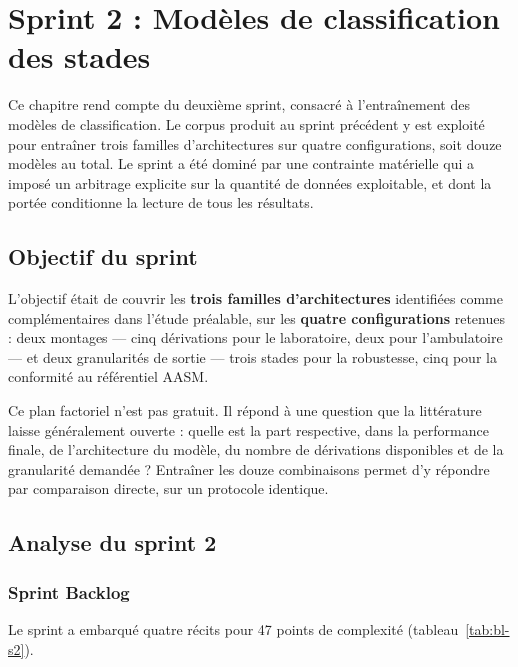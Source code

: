 \chapter{Sprint 2 : Modèles de classification des stades}
\label{chap:sprint2}


Ce chapitre rend compte du deuxième sprint, consacré à l'entraînement des modèles de
classification. Le corpus produit au sprint précédent y est exploité pour entraîner
trois familles d'architectures sur quatre configurations, soit douze modèles au total.
Le sprint a été dominé par une contrainte matérielle qui a imposé un arbitrage explicite
sur la quantité de données exploitable, et dont la portée conditionne la lecture de tous
les résultats.

\section{Objectif du sprint}

L'objectif était de couvrir les \textbf{trois familles d'architectures} identifiées
comme complémentaires dans l'étude préalable, sur les \textbf{quatre configurations}
retenues : deux montages --- cinq dérivations pour le laboratoire, deux pour
l'ambulatoire --- et deux granularités de sortie --- trois stades pour la robustesse,
cinq pour la conformité au référentiel AASM.

Ce plan factoriel n'est pas gratuit. Il répond à une question que la littérature laisse
généralement ouverte : quelle est la part respective, dans la performance finale, de
l'architecture du modèle, du nombre de dérivations disponibles et de la granularité
demandée ? Entraîner les douze combinaisons permet d'y répondre par comparaison directe,
sur un protocole identique.

\section{Analyse du sprint 2}

\subsection{Sprint Backlog}

Le sprint a embarqué quatre récits pour 47 points de complexité
(tableau~\ref{tab:bl-s2}).


